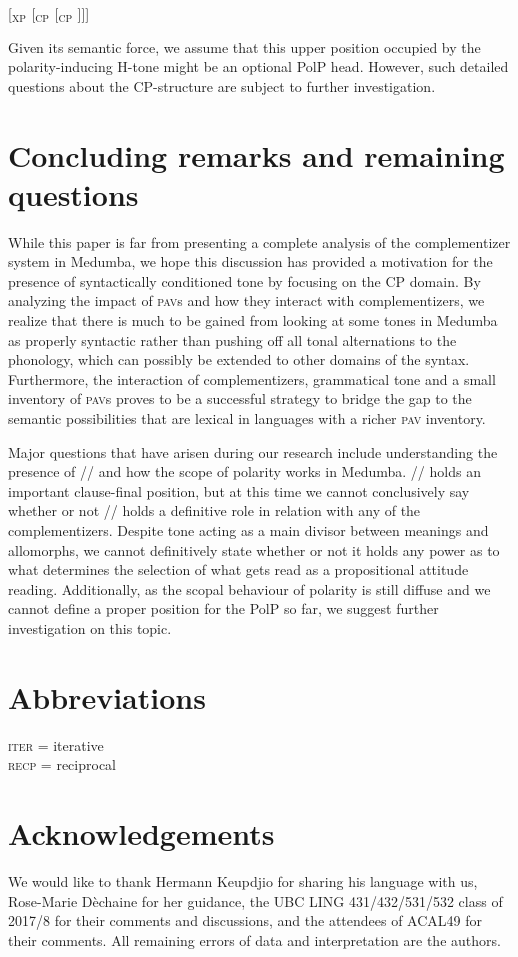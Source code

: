 \documentclass[output=paper,colorlinks,citecolor=brown]{langscibook}
\begin{document}
\ea \label{struc2}
    {[$_{\text{XP}}$  [$_{\text{CP}}$ \text{ {\mbuL} } [$_{\text{CP}}$ ]]]}
\z

Given its semantic force, we assume that this upper position occupied by the polarity-inducing H-tone might be an optional PolP head. However, such detailed questions about the CP-structure are subject to further investigation.

\section{Concluding remarks and remaining questions}

While this paper is far from presenting a complete analysis of the complementizer system in Medumba, we hope this discussion has provided a motivation for the presence of syntactically conditioned tone by focusing on the CP domain. By analyzing the impact of \textsc{pav}s and how they interact with  complementizers, we realize that there is much to be gained from looking at some tones in Medumba as properly syntactic rather than pushing off all tonal alternations to the phonology, which can possibly be extended to other domains of the syntax. Furthermore, the interaction of complementizers, grammatical tone and a small inventory of \textsc{pav}s proves to be a successful strategy to bridge the gap to the semantic possibilities that are lexical in languages with a richer \textsc{pav} inventory.

Major questions that have arisen during our research include understanding the presence of /\la/ and how the scope of polarity works in Medumba. /\la/ holds an important clause-final position, but at this time we cannot conclusively say whether or not /\la/ holds a definitive role in relation with any of the complementizers. Despite tone acting as a main divisor between meanings and allomorphs, we cannot definitively state whether or not it holds any power as to what determines the selection of what gets read as a propositional attitude reading. Additionally, as the scopal behaviour of polarity is still diffuse and we cannot define a proper position for the PolP so far, we suggest further investigation on this topic.

\section*{Abbreviations}

\textsc{iter} = iterative \\
\textsc{recp} = reciprocal

\section*{Acknowledgements}

We would like to thank Hermann Keupdjio for sharing his language with us, Rose-Marie Dèchaine for her guidance, the UBC LING 431/432/531/532 class of 2017/8 for their comments and discussions, and the attendees of ACAL49 for their comments. All remaining errors of data and interpretation are the authors.

{\sloppy\printbibliography[heading=subbibliography,notkeyword=this]}
\end{document}
